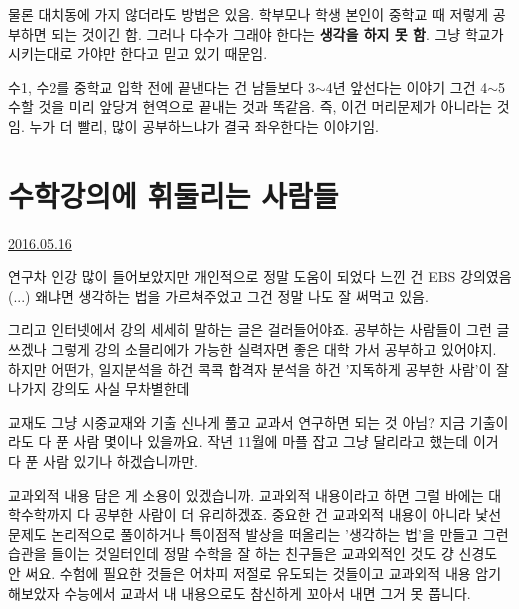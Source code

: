 물론 대치동에 가지 않더라도 방법은 있음. 학부모나 학생 본인이 중학교 때 저렇게 공부하면 되는 것이긴 함.
그러나 다수가 그래야 한다는 \textbf{생각을 하지 못 함}. 그냥 학교가 시키는대로 가야만 한다고 믿고 있기 때문임.
\vspace{5mm}

수1, 수2를 중학교 입학 전에 끝낸다는 건 남들보다 3$\sim$4년 앞선다는 이야기
그건 4$\sim$5수할 것을 미리 앞당겨 현역으로 끝내는 것과 똑같음. 즉, 이건 머리문제가 아니라는 것임.
누가 더 빨리, 많이 공부하느냐가 결국 좌우한다는 이야기임.
\vspace{5mm}











\section{수학강의에 휘둘리는 사람들}
\href{https://www.kockoc.com/Apoc/775832}{2016.05.16}

\vspace{5mm}

연구차 인강 많이 들어보았지만
개인적으로 정말 도움이 되었다 느낀 건 EBS 강의였음(...)
왜냐면 생각하는 법을 가르쳐주었고 그건 정말 나도 잘 써먹고 있음.
\vspace{5mm}

그리고 인터넷에서 강의 세세히 말하는 글은 걸러들어야죠. 공부하는 사람들이 그런 글 쓰겠나
그렇게 강의 소믈리에가 가능한 실력자면 좋은 대학 가서 공부하고 있어야지.
하지만 어떤가, 일지분석을 하건 콕콕 합격자 분석을 하건 '지독하게 공부한 사람'이 잘 나가지 강의도 사실 무차별한데
\vspace{5mm}

교재도 그냥 시중교재와 기출 신나게 풀고 교과서 연구하면 되는 것 아님?
지금 기출이라도 다 푼 사람 몇이나 있을까요.
작년 11월에 마플 잡고 그냥 달리라고 했는데 이거 다 푼 사람 있기나 하겠습니까만.
\vspace{5mm}

교과외적 내용 담은 게 소용이 있겠습니까. 교과외적 내용이라고 하면 그럴 바에는 대학수학까지 다 공부한 사람이 더 유리하겠죠.
중요한 건 교과외적 내용이 아니라 낯선 문제도 논리적으로 풀이하거나
특이점적 발상을 떠올리는 '생각하는 법'을 만들고 그런 습관을 들이는 것일터인데
정말 수학을 잘 하는 친구들은 교과외적인 것도 걍 신경도 안 써요. 수험에 필요한 것들은 어차피 저절로 유도되는 것들이고
교과외적 내용 암기해보았자 수능에서 교과서 내 내용으로도 참신하게 꼬아서 내면 그거 못 풉니다.
\vspace{5mm}

